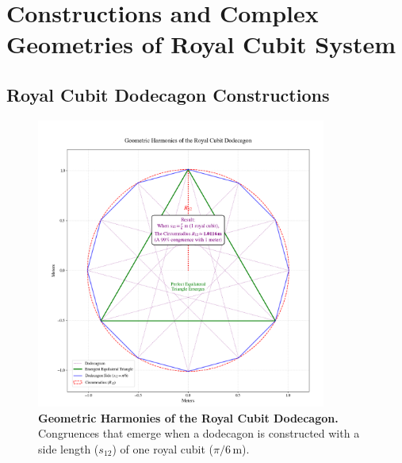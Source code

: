 \documentclass[11pt]{article}
\begin{document}
\newpage
\section{Constructions and Complex Geometries of Royal Cubit System}
\subsection{Royal Cubit Dodecagon Constructions}

\begin{figure}[htbp]
\centering
\includegraphics[width=0.85\textwidth]{figures/dodeca-fig.png}
\caption{
    \textbf{Geometric Harmonies of the Royal Cubit Dodecagon.} Congruences that emerge when a dodecagon is constructed with a side length ($s_{12}$) of one royal cubit ($\pi/6\,\text{m}$). 
} 

\label{fig:dodecagon_harmonies}
\end{figure}
\end{document}
